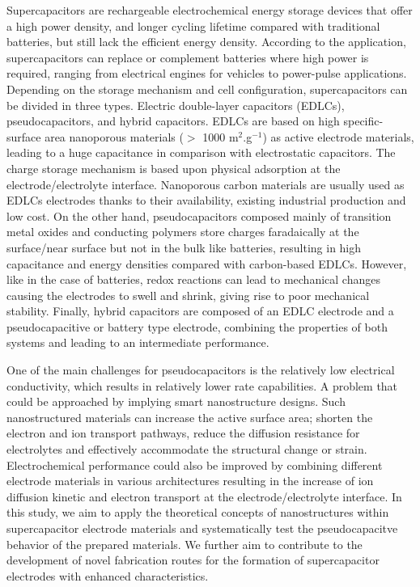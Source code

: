 \documentclass[reprint,amsmath,amssymb,aps,floatfix,
]{revtex4-2}
\begin{document}
Supercapacitors are rechargeable electrochemical energy storage devices that offer a high  power density, and longer cycling lifetime compared with traditional batteries, but still lack the efficient energy density. According to the application, supercapacitors can replace or complement batteries where high power is required, ranging from electrical engines for vehicles to power-pulse applications. Depending on the storage mechanism and cell configuration, supercapacitors can be divided in three types. Electric double-layer capacitors (EDLCs), pseudocapacitors, and hybrid capacitors. EDLCs are based on high specific-surface area nanoporous materials ($>$ 1000 m$^{2}$.g$^{-1}$) as active electrode materials, leading to a huge capacitance in comparison with electrostatic capacitors. The charge storage mechanism is based upon physical adsorption at the electrode/electrolyte interface. Nanoporous carbon materials are usually used as EDLCs electrodes thanks to their availability, existing industrial production and low cost. On the other hand,  pseudocapacitors composed mainly of transition metal oxides and conducting polymers store charges faradaically at the surface/near surface but not in the bulk like batteries, resulting in high capacitance and energy densities compared with carbon-based EDLCs. However, like in the case of batteries, redox reactions can lead to mechanical changes causing the electrodes to swell and shrink, giving rise to poor mechanical stability. Finally, hybrid capacitors are composed of an EDLC electrode and a pseudocapacitive or battery type electrode, combining the properties of both systems and leading to an intermediate performance.

One of the main challenges for pseudocapacitors is the relatively low electrical conductivity, which results in relatively lower rate capabilities.\cite{Dronskowski2017} A problem that could be approached by implying smart nanostructure designs. Such nanostructured materials can increase the active surface area; shorten the electron and ion transport pathways, reduce the diffusion resistance for electrolytes and effectively accommodate the structural change or strain.\cite{PELL1996255} Electrochemical performance could also be improved by combining different electrode materials in various architectures resulting in the increase of ion diffusion kinetic and electron transport at the electrode/electrolyte interface. In this study, we aim to apply the theoretical concepts of nanostructures within supercapacitor electrode materials and systematically test the pseudocapacitve behavior of the prepared materials. We further aim to contribute to the development of novel fabrication routes for the formation of supercapacitor electrodes with  enhanced characteristics.
\end{document}
